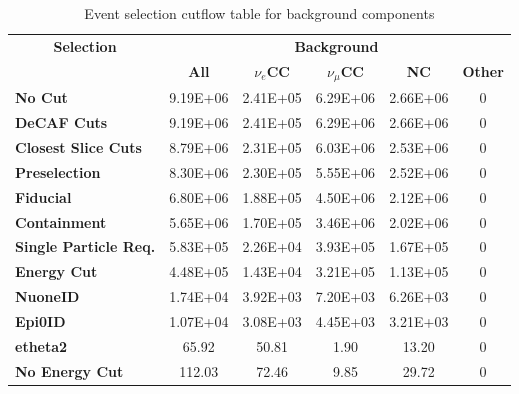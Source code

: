 \documentclass[12pt]{article}
\begin{document}
\begin{table}[!hb]
\begin{tabular}{|l|ccccc|}\hline
\multicolumn{1}{|c|}{\multirow{2}{*}{\textbf{Selection}}} & \multicolumn{5}{c|}{\textbf{Background}}                                        \\
\multicolumn{1}{|c|}{}                                    & \textbf{All} & \textbf{$\nu_e$CC} & \textbf{$\nu_\mu$CC} & \textbf{NC} & \textbf{Other} \\\hline
\textbf{No Cut}                                         & 9.19E+06     & 2.41E+05       & 6.29E+06        & 2.66E+06    & 0              \\
\textbf{DeCAF Cuts}                                     & 9.19E+06     & 2.41E+05       & 6.29E+06        & 2.66E+06    & 0              \\
\textbf{Closest Slice Cuts}                             & 8.79E+06     & 2.31E+05       & 6.03E+06        & 2.53E+06    & 0              \\
\textbf{Preselection}                                   & 8.30E+06     & 2.30E+05       & 5.55E+06        & 2.52E+06    & 0              \\
\textbf{Fiducial}                                       & 6.80E+06     & 1.88E+05       & 4.50E+06        & 2.12E+06    & 0              \\
\textbf{Containment}                                    & 5.65E+06     & 1.70E+05       & 3.46E+06        & 2.02E+06    & 0              \\
\textbf{Single Particle Req.}                           & 5.83E+05     & 2.26E+04       & 3.93E+05        & 1.67E+05    & 0              \\
\textbf{Energy Cut}                                     & 4.48E+05     & 1.43E+04       & 3.21E+05        & 1.13E+05    & 0              \\
\textbf{NuoneID}                                        & 1.74E+04     & 3.92E+03       & 7.20E+03        & 6.26E+03    & 0              \\
\textbf{Epi0ID}                                         & 1.07E+04     & 3.08E+03       & 4.45E+03        & 3.21E+03    & 0              \\
\rowcolor[HTML]{67FD9A}
\textbf{etheta2}                                        & 65.92        & 50.81          & 1.90            & 13.20       & 0              \\\hline\hline
\textbf{No Energy Cut}                                  & 112.03       & 72.46          & 9.85            & 29.72       & 0   \\\hline
\end{tabular}
\caption{Event selection cutflow table for background components}
\label{tab:CutflowTableBackground}
\end{table}
\end{document}

